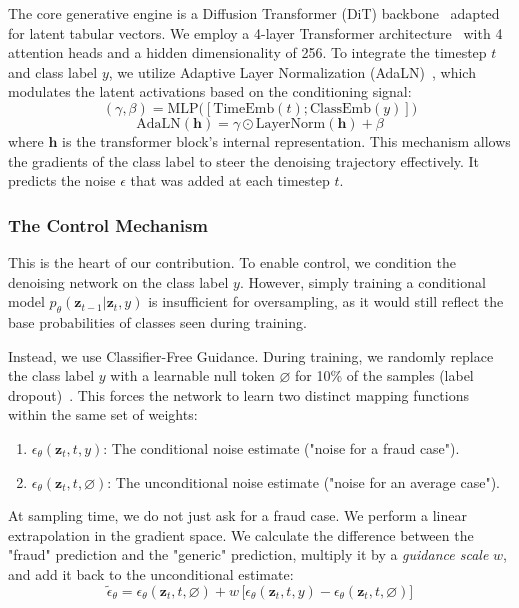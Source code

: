 \documentclass[conference]{IEEEtran}
\begin{document}
The core generative engine is a Diffusion Transformer (DiT) backbone~\cite{peebles2023dit} adapted for latent tabular vectors. We employ a 4-layer Transformer architecture~\cite{vaswani2017attention} with 4 attention heads and a hidden dimensionality of 256. To integrate the timestep $t$ and class label $y$, we utilize Adaptive Layer Normalization (AdaLN)~\cite{ba2016layernorm}, which modulates the latent activations based on the conditioning signal:
\begin{equation}
(\gamma, \beta) = \mathrm{MLP}\bigl([\text{TimeEmb}(t); \text{ClassEmb}(y)]\bigr)
\end{equation}
\begin{equation}
\mathrm{AdaLN}(\mathbf{h}) = \gamma \odot \mathrm{LayerNorm}(\mathbf{h}) + \beta
\end{equation}
where $\mathbf{h}$ is the transformer block's internal representation. This mechanism allows the gradients of the class label to steer the denoising trajectory effectively. It predicts the noise $\epsilon$ that was added at each timestep $t$.

\subsubsection{The Control Mechanism}
This is the heart of our contribution. To enable control, we condition the denoising network on the class label $y$. However, simply training a conditional model $p_\theta(\mathbf{z}_{t-1}|\mathbf{z}_t, y)$ is insufficient for oversampling, as it would still reflect the base probabilities of classes seen during training.

Instead, we use Classifier-Free Guidance. During training, we randomly replace the class label $y$ with a learnable null token $\varnothing$ for 10\% of the samples (label dropout)~\cite{srivastava2014dropout}. This forces the network to learn two distinct mapping functions within the same set of weights:
\begin{enumerate}
    \item $\epsilon_\theta(\mathbf{z}_t, t, y)$: The conditional noise estimate ("noise for a fraud case").
    \item $\epsilon_\theta(\mathbf{z}_t, t, \varnothing)$: The unconditional noise estimate ("noise for an average case").
\end{enumerate}

At sampling time, we do not just ask for a fraud case. We perform a linear extrapolation in the gradient space. We calculate the difference between the "fraud" prediction and the "generic" prediction, multiply it by a \textit{guidance scale} $w$, and add it back to the unconditional estimate:
\begin{equation}
\tilde{\epsilon}_\theta = \epsilon_\theta(\mathbf{z}_t, t, \varnothing) + w \,\bigl[\epsilon_\theta(\mathbf{z}_t, t, y) - \epsilon_\theta(\mathbf{z}_t, t, \varnothing)\bigr]
\end{equation}
\end{document}
